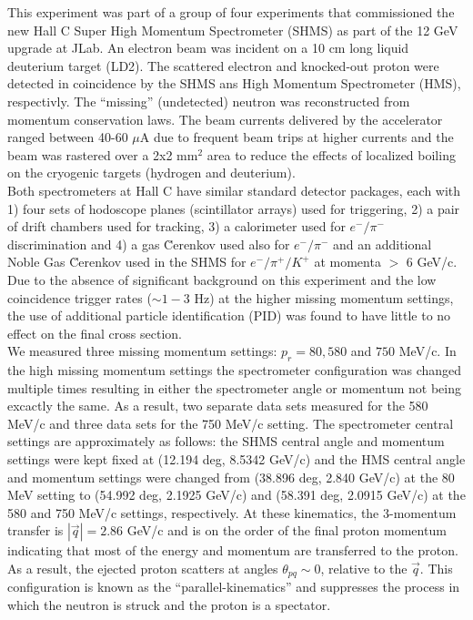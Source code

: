\indent This experiment was part of a group of four experiments that commissioned the new Hall C Super High Momentum Spectrometer (SHMS) as part of the 12 GeV upgrade at JLab.
An electron beam was incident on a 10 cm long liquid deuterium target (LD2). The scattered electron and knocked-out proton were detected in coincidence
by the SHMS ans High Momentum Spectrometer (HMS), respectivly. The ``missing'' (undetected) neutron was reconstructed from momentum conservation laws.
The beam currents delivered by the accelerator ranged between 40-60 $\mu$A due to frequent beam trips at higher currents and the beam was rastered over a 2x2 mm$^{2}$ area to reduce
the effects of localized boiling on the cryogenic targets (hydrogen and deuterium). \\
\indent Both spectrometers at Hall C have similar standard detector packages, each with 1) four sets of hodoscope planes (scintillator arrays) used for triggering,
2) a pair of drift chambers used for tracking, 3) a calorimeter used for $e^{-}/\pi^{-}$ discrimination and 4) a gas \u{C}erenkov used also for $e^{-}/\pi^{-}$ and an additional
Noble Gas \u{C}erenkov used in the SHMS for $e^{-}/\pi^{+}/K^{+}$ at momenta $>$ 6 GeV/c. Due to the absence of significant background on this experiment and the low coincidence trigger rates
($\sim 1-3$ Hz) at the higher missing momentum settings, the use of additional particle identification (PID) was found to have little to no effect on the final cross section. \\
\indent We measured three missing momentum settings: $p_{r}=80,580$ and $750$ MeV/c. In the high missing momentum settings the spectrometer configuration was changed
multiple times resulting in either the spectrometer angle or momentum not being excactly the same. As a result, two separate data sets measured for the 580 MeV/c and three data sets for the 750 MeV/c setting.  
The spectrometer central settings are approximately as follows: the SHMS central angle and momentum settings were kept fixed at (12.194 deg, 8.5342 GeV/c) and the HMS central angle and momentum settings were changed from
(38.896 deg, 2.840 GeV/c) at the 80 MeV setting to (54.992 deg, 2.1925 GeV/c) and (58.391 deg, 2.0915 GeV/c) at the 580 and 750 MeV/c settings, respectively. At these kinematics, the
3-momentum transfer is $|\vec{q}| = 2.86$ GeV/c and is on the order of the final proton momentum indicating that most of the energy and momentum are transferred to the proton. As a result, the ejected proton
scatters at angles $\theta_{pq}\sim 0$, relative to the $\vec{q}$. This configuration is known as the ``parallel-kinematics'' and suppresses the process in which the neutron is struck and the proton is a spectator. \\
